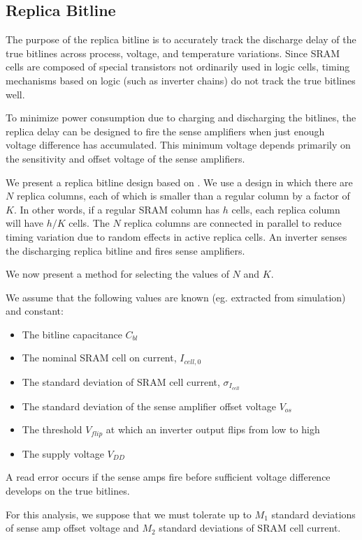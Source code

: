 \subsection{Replica Bitline} \label{sec:replica-bitline}

The purpose of the replica bitline is to accurately track the discharge delay of the true bitlines across
process, voltage, and temperature variations. Since SRAM cells are composed of special transistors
not ordinarily used in logic cells, timing mechanisms based on logic (such as inverter chains) do not
track the true bitlines well.

To minimize power consumption due to charging and discharging the bitlines,
the replica delay can be designed to fire the sense amplifiers when just enough voltage difference
has accumulated. This minimum voltage depends primarily on the sensitivity and offset voltage of the
sense amplifiers.

We present a replica bitline design based on \cite{replicabl}.
We use a design in which there are $N$ replica columns, each of which is smaller than a regular column by a factor of $K$. In other words, if a regular SRAM column has $h$ cells, each replica column will have $h/K$ cells.
The $N$ replica columns are connected in parallel to reduce timing variation due to random effects in active replica cells.
An inverter senses the discharging replica bitline and fires sense amplifiers.

We now present a method for selecting the values of $N$ and $K$.

We assume that the following values are known (eg. extracted from simulation) and constant:
\begin{itemize}
\item The bitline capacitance $C_{bl}$
\item The nominal SRAM cell on current, $I_{cell,0}$
\item The standard deviation of SRAM cell current, $\sigma_{I_{cell}}$
\item The standard deviation of the sense amplifier offset voltage $V_{os}$
\item The threshold $V_{flip}$ at which an inverter output flips from low to high
\item The supply voltage $V_{DD}$
\end{itemize}

A read error occurs if the sense amps fire before sufficient voltage difference develops on the true bitlines.

For this analysis, we suppose that we must tolerate up to $M_1$ standard deviations of sense amp offset voltage
and $M_2$ standard deviations of SRAM cell current.

